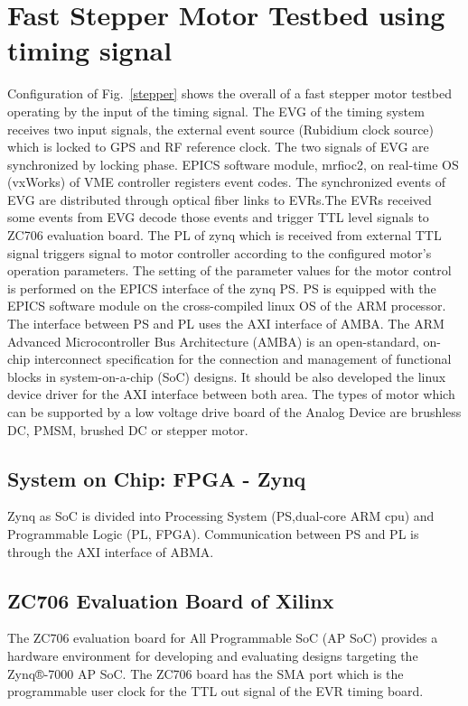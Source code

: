 \documentclass[a4paper,
              ]{jacow}
\begin{document}
\section{Fast Stepper Motor Testbed using timing signal}
Configuration of Fig.~\ref{stepper} shows the overall of a fast stepper motor testbed operating by the input of the timing signal. The EVG of the timing system receives two input signals, the external event source (Rubidium clock source) which is locked to GPS and RF reference clock. The two signals of EVG are synchronized by locking phase. EPICS software module, mrfioc2, on real-time OS (vxWorks) of VME controller registers event codes. The synchronized events of EVG are distributed through optical fiber links to EVRs.The EVRs received some events from EVG decode those events and trigger TTL level signals to ZC706 evaluation board. The PL of zynq which is received from external TTL signal triggers signal to motor controller according to the configured motor's operation parameters. The setting of the parameter values for the motor control is performed on the EPICS interface of the zynq PS. PS is equipped with the EPICS software module on the cross-compiled linux OS of the ARM processor. The interface between PS and PL uses the AXI interface of AMBA. The ARM Advanced Microcontroller Bus Architecture (AMBA)\cite{amba-bus} is an open-standard, on-chip interconnect specification for the connection and management of functional blocks in system-on-a-chip (SoC) designs. It should be also developed the linux device driver for the AXI interface between both area. The types of motor which can be supported by a low voltage drive board of the Analog Device\cite{analog} are brushless DC, PMSM, brushed DC or stepper motor. 

\subsection{System on Chip: FPGA - Zynq}
Zynq\cite{xilix,zynq} as SoC is divided into Processing System (PS,dual-core ARM cpu) and  Programmable Logic (PL, FPGA). Communication between PS and PL is through the AXI interface of ABMA.

\subsection{ZC706 Evaluation Board of Xilinx}
The ZC706 evaluation board for All Programmable SoC (AP SoC) provides a hardware environment for developing and evaluating designs targeting the Zynq®-7000 AP SoC.\cite{zc706-doc} The ZC706 board has the SMA port which is the programmable user clock for the TTL out signal of the EVR timing board.
\end{document}
